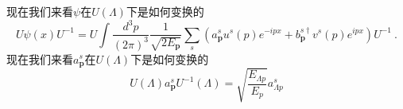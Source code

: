 现在我们来看$\psi$在$U(\Lambda)$下是如何变换的
\begin{equation}
U \psi(x) U^{-1} = U \int \frac{d^3p}{(2\pi)^3} \frac{1}{\sqrt{2 E_{\mathbf p}}} \sum_s (a_{\mathbf p}^s u^s(p) e^{-ipx}+b_{\mathbf p}^{s\dagger}v^s(p)e^{ipx})U^{-1}~.
\end{equation}
现在我们来看$a^s_{\mathbf p}$在$U(\Lambda)$下是如何变换的
\begin{equation}
U(\Lambda)a^s_{\mathbf p} U^{-1}(\Lambda) = \sqrt{\frac{E_{\Lambda p}}{E_{p}}} a_{\Lambda p }^s
\end{equation}





















